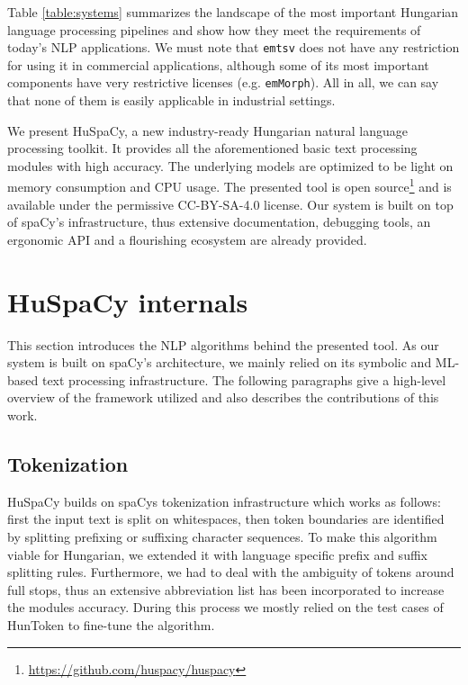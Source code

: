 \documentclass{llncs}
\newcommand{\emtsv}{\texttt{emtsv}}
\newcommand{\huspacy}{HuSpaCy}
\newcommand{\huntoken}{HunToken}
\begin{document}
Table \ref{table:systems} summarizes the landscape of the most important Hungarian language processing pipelines and show how they meet the requirements of today’s NLP applications. We must note that \emtsv{} does not have any restriction for using it in commercial applications, although some of its most important components have very restrictive licenses (e.g. \texttt{emMorph}). All in all, we can say that none of them is easily applicable in industrial settings.

We present \huspacy{}, a new industry-ready Hungarian natural language processing toolkit.
It provides all the aforementioned basic text processing modules with high accuracy. The underlying models are optimized to be light on memory consumption and CPU usage. The presented tool is open source\footnote{\url{https://github.com/huspacy/huspacy}} and is available under the permissive CC-BY-SA-4.0 license. Our system is built on top of spaCy’s infrastructure, thus extensive documentation, debugging tools, an ergonomic API and a flourishing ecosystem are already provided.

\section{HuSpaCy internals}

This section introduces the NLP algorithms behind the presented tool. As our system is built on spaCy’s architecture, we mainly relied on its symbolic and ML-based text processing infrastructure. The following paragraphs give a high-level overview of the framework utilized and also describes the contributions of this work.

\subsection{Tokenization}

\huspacy{} builds on spaCy\textquotesingle s \citep{spacy-tokenization} tokenization infrastructure which works as follows: first the input text is split on whitespaces, then token boundaries are identified by splitting prefixing or suffixing character sequences. To make this algorithm viable for Hungarian, we extended it with language specific prefix and suffix splitting rules. Furthermore, we had to deal with the ambiguity of tokens around full stops, thus an extensive abbreviation list has been incorporated to increase the module\textquotesingle s accuracy. During this process we mostly relied on the test cases of \huntoken{} \citep{huntoken} to fine-tune the algorithm.
\end{document}
